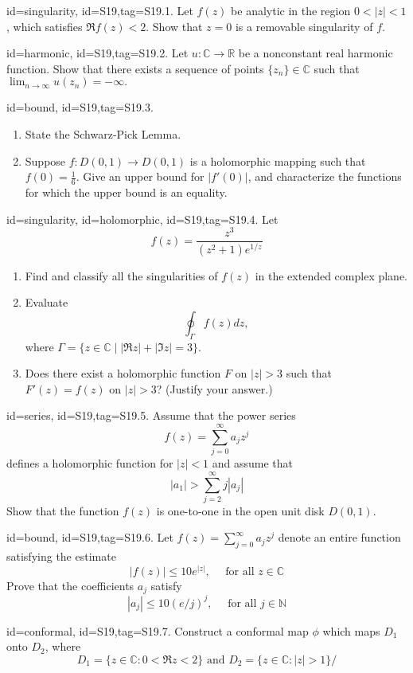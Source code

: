 \documentclass[12pt,letterpaper]{article}
\begin{document}
{\item[id=singularity, id=S19,tag=S19.1.]
Let $f(z)$ be analytic in the region $0 < | z | < 1$, which satisfies $\Re f(z) < 2$. Show that $z = 0$ is a removable singularity of $f$.
\item[id=harmonic, id=S19,tag=S19.2.]
Let $u : \mathbb{C} \rightarrow \mathbb{R}$ be a nonconstant real harmonic function. Show that there exists a sequence of points $\{z_n\} \in \mathbb{C}$ such that $\lim_{n\rightarrow \infty} u(z_n) = -\infty.$
\item[id=bound, id=S19,tag=S19.3.]
\begin{enumerate}[label=(\alph*)]\onlyitems
\item State the Schwarz-Pick Lemma.
\item Suppose $f : D(0,1) \rightarrow D(0,1)$ is a holomorphic mapping such that $f(0) = \frac{1}{6}.$ Give an upper bound for $| f'(0) |$, and characterize the functions for which the upper bound is an equality.
\end{enumerate}
\item[id=singularity, id=holomorphic, id=S19,tag=S19.4.]
Let
\[
	f(z) = \frac{z^3}{(z^2 + 1)e^{1/z}}
\]
\begin{enumerate}[label=(\alph*)]\onlyitems
\item Find and classify all the singularities of $f(z)$ in the extended complex plane.
\item Evaluate
\[
	\oint_{\Gamma} f(z) dz,
\]
where $\Gamma = \{z \in \mathbb{C} \mid | \Re z | + | \Im z | = 3\}$.
\item Does there exist a holomorphic function $F$ on $| z | > 3$ such that $F'(z) = f(z)$ on $| z | > 3$? (Justify your answer.)
\end{enumerate}

\item[id=series, id=S19,tag=S19.5.]
Assume that the power series
\[
	f(z) = \sum_{j=0}^{\infty} a_j z^j
\]
defines a holomorphic function for $| z | < 1$ and assume that
\[
	| a_1 | > \sum_{j=2}^{\infty} j | a_j |
\]
Show that the function $f(z)$ is one-to-one in the open unit disk $D(0,1)$.
\item[id=bound, id=S19,tag=S19.6.]
Let $f(z) = \sum_{j=0}^{\infty} a_j z^j$ denote an entire function satisfying the estimate
\[
	| f(z) | \le 10 e^{| z |}, \quad \text{ for all } z \in \mathbb{C}
\]
Prove that the coefficients $a_j$ satisfy
\[
	| a_j | \le 10(e/j)^j, \quad \text{ for all } j \in \mathbb{N}
\]
\item[id=conformal, id=S19,tag=S19.7.]
Construct a conformal map $\phi$ which maps $D_1$ onto $D_2$, where
\[
	D_1 = \{z \in \mathbb{C} \colon 0 < \Re z < 2\} \text{ and } D_2 = \{z \in \mathbb{C} \colon | z | > 1\}/
\]

}
\end{document}
